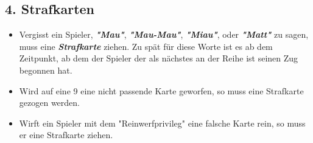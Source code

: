 \documentclass{article}
\begin{document}
\subsection*{4. Strafkarten}
\begin{itemize}
\item Vergisst ein Spieler, \textit{\textbf{"Mau"}}, \textit{\textbf{"Mau-Mau"}}, \textit{\textbf{"Miau"}}, oder 
\textit{\textbf{"Matt"}} zu sagen, muss eine \textit{\textbf{Strafkarte}} ziehen. Zu spät für diese Worte ist es ab dem Zeitpunkt, ab dem der Spieler der als nächstes an der Reihe ist seinen Zug begonnen hat.


\item Wird auf eine 9 eine nicht passende Karte geworfen, so muss eine Strafkarte gezogen werden.

\item Wirft ein Spieler mit dem "Reinwerfprivileg" eine falsche Karte rein, so muss er eine Strafkarte ziehen.
\end{itemize}         
\end{document}
